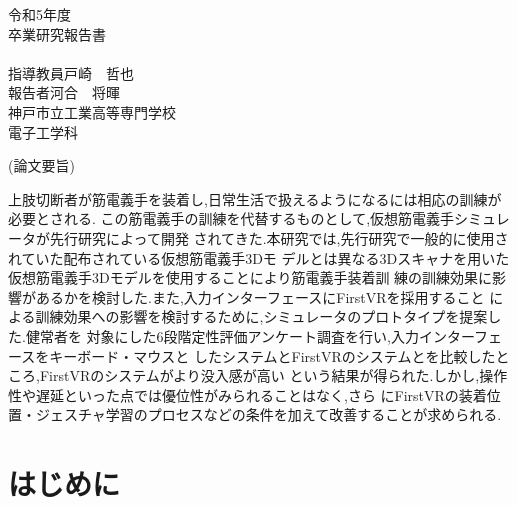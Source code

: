 \documentclass{ltjsreport}
\begin{document}
\begin{titlepage}
\begin{center}
\huge 令和5年度\\
\vspace{30pt}
\huge 卒業研究報告書\\
\vspace{50pt}
\HUGE{}\\
\vspace{250pt}
\huge 指導教員\hspace{10pt}戸崎　哲也\\
\huge 報告者\hspace{28pt}河合　将暉\\
\vspace{50pt}
\huge 神戸市立工業高等専門学校\\
\huge 電子工学科
\end{center}
\end{titlepage}
\restoregeometry
\clearpage

\begin{center}
\LARGE (論文要旨)
\end{center}
上肢切断者が筋電義手を装着し,日常生活で扱えるようになるには相応の訓練が必要とされる.
この筋電義手の訓練を代替するものとして,仮想筋電義手シミュレータが先行研究によって開発
されてきた.本研究では,先行研究で一般的に使用されていた配布されている仮想筋電義手3Dモ
デルとは異なる3Dスキャナを用いた仮想筋電義手3Dモデルを使用することにより筋電義手装着訓
練の訓練効果に影響があるかを検討した.また,入力インターフェースにFirstVRを採用すること
による訓練効果への影響を検討するために,シミュレータのプロトタイプを提案した.健常者を
対象にした6段階定性評価アンケート調査を行い,入力インターフェースをキーボード・マウスと
したシステムとFirstVRのシステムとを比較したところ,FirstVRのシステムがより没入感が高い
という結果が得られた.しかし,操作性や遅延といった点では優位性がみられることはなく,さら
にFirstVRの装着位置・ジェスチャ学習のプロセスなどの条件を加えて改善することが求められる.
\clearpage

\setcounter{tocdepth}{2}
\tableofcontents

\clearpage


\chapter{はじめに}
\end{document}
